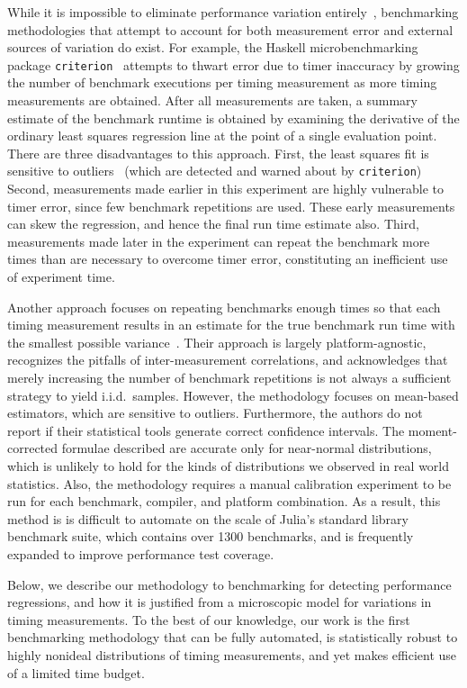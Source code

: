 \documentclass[conference]{IEEEtran}
\begin{document}
While it is impossible to eliminate performance variation
entirely~\cite{Alcocer2015,Barrett2016}, benchmarking methodologies that
attempt to account for both measurement error and external sources of variation
do exist. For example, the Haskell microbenchmarking package
\lstinline|criterion|~\cite{criterion} attempts to thwart error due to timer
inaccuracy by growing the number of benchmark executions per timing measurement
as more timing measurements are obtained. After all measurements are taken, a
summary estimate of the benchmark runtime is obtained by examining the
derivative of the ordinary least squares regression line at the point of a
single evaluation point. There are three disadvantages to this approach.
First, the least squares fit is sensitive to outliers~\cite{Maronna2006} (which
are detected and warned about by \lstinline|criterion|) Second, measurements
made earlier in this experiment are highly vulnerable to timer error, since few
benchmark repetitions are used. These early measurements can skew the
regression, and hence the final run time estimate also. Third, measurements
made later in the experiment can repeat the benchmark more times than are
necessary to overcome timer error, constituting an inefficient use of
experiment time.

Another approach focuses on repeating benchmarks enough times so that each
timing measurement results in an estimate for the true benchmark run time with
the smallest possible variance~\cite{Kalibera2013}. Their approach is largely
platform-agnostic, recognizes the pitfalls of inter-measurement correlations,
and acknowledges that merely increasing the number of benchmark repetitions is
not always a sufficient strategy to yield i.i.d.\ samples. However, the
methodology focuses on mean-based estimators, which are sensitive to outliers.
Furthermore, the authors do not report if their statistical tools generate
correct confidence intervals. The moment-corrected formulae described are
accurate only for near-normal distributions, which is unlikely to hold for the
kinds of distributions we observed in real world statistics.
Also, the methodology requires a manual calibration experiment to be run for
each benchmark, compiler, and platform combination. As a result, this method is
is difficult to automate on the scale of Julia's standard library benchmark
suite, which contains over 1300 benchmarks, and is frequently expanded to
improve performance test coverage.

Below, we describe our methodology to benchmarking for detecting performance
regressions, and how it is justified from a microscopic model for variations in
timing measurements. To the best of our knowledge, our work is the first
benchmarking methodology that can be fully automated, is statistically robust
to highly nonideal distributions of timing measurements, and yet makes
efficient use of a limited time budget.
\end{document}
